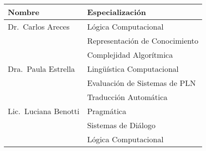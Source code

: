 
\begin{center}\small
    \begin{minipage}{\linewidth}
        \begin{center}
        \begin{tabular}{|l|l|}
        \hline\hline
        Nombre &  Especializaci\'on \\
        \hline
        Dr.\ Carlos Areces &
          L\'ogica Computacional\\
        & Representaci\'on de Conocimiento\\
        & Complejidad Algor\'itmica
      \\ \hline
        Dra.\ Paula Estrella &
          Ling\"u\'istica Computacional \\
        & Evaluaci\'on de Sistemas de PLN
      \\
		& Traducci\'on Autom\'atica \\ \hline
        Lic.\ Luciana Benotti &
          Pragm\'atica \\
        & Sistemas de Di\'alogo\\
        & L\'ogica Computacional\\
        \hline\hline
        \end{tabular}
        \end{center}
    \end{minipage}
\end{center}

